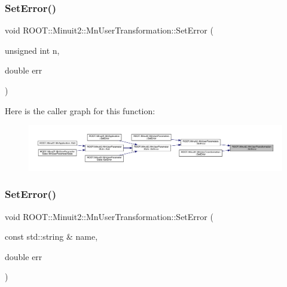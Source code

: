 \mbox{\label{classROOT_1_1Minuit2_1_1MnUserTransformation_a6256d78c2aafb1142eadc811ee981d79}} 
\subsubsection{\texorpdfstring{SetError()}{SetError()}\hspace{0.1cm}{\footnotesize\ttfamily [2/4]}}
{\footnotesize\ttfamily void R\+O\+O\+T\+::\+Minuit2\+::\+Mn\+User\+Transformation\+::\+Set\+Error (\begin{DoxyParamCaption}\item[{unsigned int}]{n,  }\item[{double}]{err }\end{DoxyParamCaption})}

Here is the caller graph for this function\+:\nopagebreak
\begin{figure}[H]
\begin{center}
\leavevmode
\includegraphics[width=350pt]{d9/d98/classROOT_1_1Minuit2_1_1MnUserTransformation_a6256d78c2aafb1142eadc811ee981d79_icgraph}
\end{center}
\end{figure}
\mbox{\label{classROOT_1_1Minuit2_1_1MnUserTransformation_ae63d2c7ee55629e691973082b1099e30}} 
\subsubsection{\texorpdfstring{SetError()}{SetError()}\hspace{0.1cm}{\footnotesize\ttfamily [3/4]}}
{\footnotesize\ttfamily void R\+O\+O\+T\+::\+Minuit2\+::\+Mn\+User\+Transformation\+::\+Set\+Error (\begin{DoxyParamCaption}\item[{const std\+::string \&}]{name,  }\item[{double}]{err }\end{DoxyParamCaption})}

